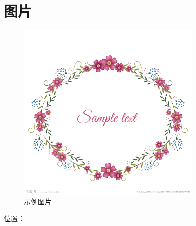 \section{图片}
\begin{figure}[htbp]
    \centering
    \includegraphics[width=0.8\textwidth]{img/eg_png.png}
    \caption{示例图片}
    \label{fig:example}
\end{figure}
位置：

